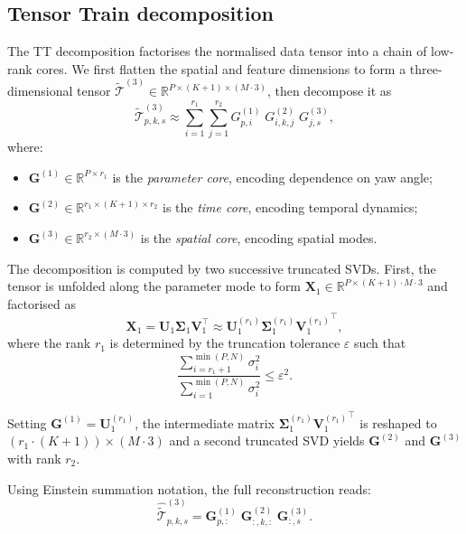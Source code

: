 \documentclass[12pt]{article}
\newcommand{\R}{\mathbb{R}}
\newcommand{\tensor}[1]{\boldsymbol{\mathcal{#1}}}
\newcommand{\mat}[1]{\mathbf{#1}}
\begin{document}
\subsection{Tensor Train decomposition}
\label{sec:tt}

The TT decomposition \citep{Oseledets2011} factorises the normalised data tensor into a chain of low-rank cores.
We first flatten the spatial and feature dimensions to form a three-dimensional tensor $\tilde{\tensor{T}}^{(3)} \in \R^{P \times (K+1) \times (M \cdot 3)}$, then decompose it as
\begin{equation}
\label{eq:tt}
    \tilde{\tensor{T}}^{(3)}_{p,k,s} \approx \sum_{i=1}^{r_1} \sum_{j=1}^{r_2} G^{(1)}_{p,i} \; G^{(2)}_{i,k,j} \; G^{(3)}_{j,s},
\end{equation}
where:
\begin{itemize}
    \item $\mat{G}^{(1)} \in \R^{P \times r_1}$ is the \emph{parameter core}, encoding dependence on yaw angle;
    \item $\mat{G}^{(2)} \in \R^{r_1 \times (K+1) \times r_2}$ is the \emph{time core}, encoding temporal dynamics;
    \item $\mat{G}^{(3)} \in \R^{r_2 \times (M \cdot 3)}$ is the \emph{spatial core}, encoding spatial modes.
\end{itemize}

The decomposition is computed by two successive truncated SVDs.
First, the tensor is unfolded along the parameter mode to form $\mat{X}_1 \in \R^{P \times (K+1) \cdot M \cdot 3}$ and factorised as
\begin{equation}
    \mat{X}_1 = \mat{U}_1 \mat{\Sigma}_1 \mat{V}_1^\top \approx \mat{U}_1^{(r_1)} \mat{\Sigma}_1^{(r_1)} {\mat{V}_1^{(r_1)}}^\top,
\end{equation}
where the rank $r_1$ is determined by the truncation tolerance $\varepsilon$ such that
\begin{equation}
    \frac{\sum_{i=r_1+1}^{\min(P,N)} \sigma_i^2}{\sum_{i=1}^{\min(P,N)} \sigma_i^2} \leq \varepsilon^2.
\end{equation}

Setting $\mat{G}^{(1)} = \mat{U}_1^{(r_1)}$, the intermediate matrix $\mat{\Sigma}_1^{(r_1)} {\mat{V}_1^{(r_1)}}^\top$ is reshaped to $(r_1 \cdot (K+1)) \times (M \cdot 3)$ and a second truncated SVD yields $\mat{G}^{(2)}$ and $\mat{G}^{(3)}$ with rank $r_2$.

Using Einstein summation notation, the full reconstruction reads:
\begin{equation}
\label{eq:reconstruct}
    \hat{\tilde{\tensor{T}}}^{(3)}_{p,k,s} = \mat{G}^{(1)}_{p,:} \; \mat{G}^{(2)}_{:,k,:} \; \mat{G}^{(3)}_{:,s}.
\end{equation}
\end{document}
